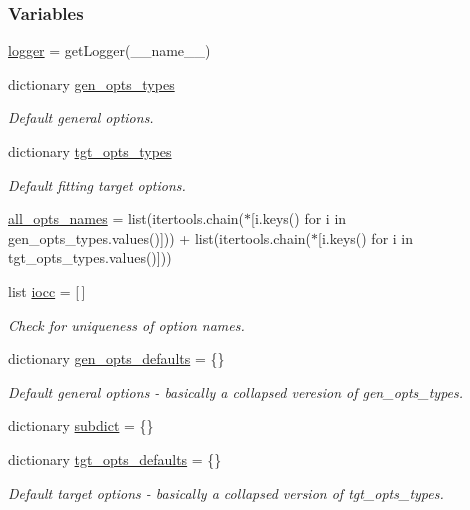 \subsubsection*{Variables}
\begin{DoxyCompactItemize}
\item 
\hyperlink{namespacesrc_1_1parser_a37a64ec016ef29a383149466e0531dc2}{logger} = get\+Logger(\+\_\+\+\_\+name\+\_\+\+\_\+)
\item 
dictionary \hyperlink{namespacesrc_1_1parser_a87f26164b219a12ecb4b5e6408993d9f}{gen\+\_\+opts\+\_\+types}
\begin{DoxyCompactList}\small\item\em Default general options. \end{DoxyCompactList}\item 
dictionary \hyperlink{namespacesrc_1_1parser_a2bdfa0e60da43a8d38b4a460cde96c27}{tgt\+\_\+opts\+\_\+types}
\begin{DoxyCompactList}\small\item\em Default fitting target options. \end{DoxyCompactList}\item 
\hyperlink{namespacesrc_1_1parser_a26b1b3d3368acc2ec0ec971560d78275}{all\+\_\+opts\+\_\+names} = list(itertools.\+chain($\ast$\mbox{[}i.\+keys() for i in gen\+\_\+opts\+\_\+types.\+values()\mbox{]})) + list(itertools.\+chain($\ast$\mbox{[}i.\+keys() for i in tgt\+\_\+opts\+\_\+types.\+values()\mbox{]}))
\item 
list \hyperlink{namespacesrc_1_1parser_aa00075364aedd66048fd3e55084557e3}{iocc} = \mbox{[}$\,$\mbox{]}
\begin{DoxyCompactList}\small\item\em Check for uniqueness of option names. \end{DoxyCompactList}\item 
dictionary \hyperlink{namespacesrc_1_1parser_ad13e9dbc3f7c04ae17a7511611623c05}{gen\+\_\+opts\+\_\+defaults} = \{\}
\begin{DoxyCompactList}\small\item\em Default general options -\/ basically a collapsed veresion of gen\+\_\+opts\+\_\+types. \end{DoxyCompactList}\item 
dictionary \hyperlink{namespacesrc_1_1parser_acb02e552cbc9ba8a6aa198cfb3f611d1}{subdict} = \{\}
\item 
dictionary \hyperlink{namespacesrc_1_1parser_ae5983fa8e346d61dd63f2ecb04d1b2ab}{tgt\+\_\+opts\+\_\+defaults} = \{\}
\begin{DoxyCompactList}\small\item\em Default target options -\/ basically a collapsed version of tgt\+\_\+opts\+\_\+types. \end{DoxyCompactList}\item 

\end{DoxyCompactItemize}
